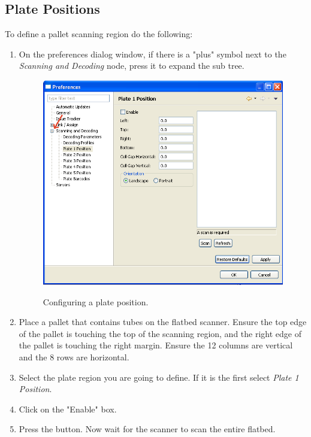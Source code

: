 \subsection{Plate Positions}
To define a pallet scanning region do the following:
\begin{enumerate}
  \item On the preferences dialog window, if there is a "plus" symbol next to
    the \emph{Scanning and Decoding} node, press it to expand the sub
    tree.
    \begin{figure}[H]
      \centering
      \scalebox{0.5}
      { \includegraphics*{screenshots/configuration/plate1_definition} }
      \caption{Configuring a plate position.}
      \label{fig:plate1_definition}
    \end{figure}
  \item Place a pallet that contains tubes on the flatbed scanner. Ensure the
    top edge of the pallet is touching the top of the scanning region, and the right
    edge of the pallet is touching the right margin. Ensure the 12 columns
    are vertical and the 8 rows are horizontal.
  \item Select the plate region you are going to define.  If it is the first
    select \emph{Plate 1 Position}.
  \item Click on the "Enable" box.
  \item Press the  button. Now wait for the scanner to scan the entire
    flatbed.
    \begin{figure}[H]

\end{figure}
\end{enumerate}
